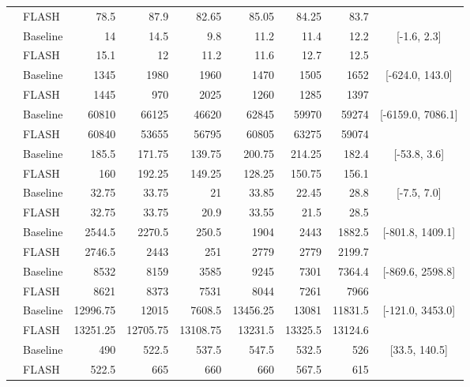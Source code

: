 \documentclass{article} %
\begin{document}
\begin{table}[H]
{\begin{tabular}{@{}ll*{5}{r}rc@{}}
 & FLASH & 78.5 & 87.9 & 82.65 & 85.05 & 84.25 & 83.7 &  \\
\addlinespace[1pt]
\multirow{2}{*}{Breakout} & Baseline & 14 & 14.5 & 9.8 & 11.2 & 11.4 & 12.2 & \multirow{2}{*}{[-1.6, 2.3]} \\
 & FLASH & 15.1 & 12 & 11.2 & 11.6 & 12.7 & 12.5 &  \\
\addlinespace[1pt]
\multirow{2}{*}{ChopperCommand} & Baseline & 1345 & 1980 & 1960 & 1470 & 1505 & 1652 & \multirow{2}{*}{[-624.0, 143.0]} \\
 & FLASH & 1445 & 970 & 2025 & 1260 & 1285 & 1397 &  \\
\addlinespace[1pt]
\multirow{2}{*}{CrazyClimber} & Baseline & 60810 & 66125 & 46620 & 62845 & 59970 & 59274 & \multirow{2}{*}{[-6159.0, 7086.1]} \\
 & FLASH & 60840 & 53655 & 56795 & 60805 & 63275 & 59074 &  \\
\addlinespace[1pt]
\multirow{2}{*}{DemonAttack} & Baseline & 185.5 & 171.75 & 139.75 & 200.75 & 214.25 & 182.4 & \multirow{2}{*}{[-53.8, 3.6]} \\
 & FLASH & 160 & 192.25 & 149.25 & 128.25 & 150.75 & 156.1 &  \\
\addlinespace[1pt]
\multirow{2}{*}{Freeway} & Baseline & 32.75 & 33.75 & 21 & 33.85 & 22.45 & 28.8 & \multirow{2}{*}{[-7.5, 7.0]} \\
 & FLASH & 32.75 & 33.75 & 20.9 & 33.55 & 21.5 & 28.5 &  \\
\addlinespace[1pt]
\multirow{2}{*}{Frostbite} & Baseline & 2544.5 & 2270.5 & 250.5 & 1904 & 2443 & 1882.5 & \multirow{2}{*}{[-801.8, 1409.1]} \\
 & FLASH & 2746.5 & 2443 & 251 & 2779 & 2779 & 2199.7 &  \\
\addlinespace[1pt]
\multirow{2}{*}{Gopher} & Baseline & 8532 & 8159 & 3585 & 9245 & 7301 & 7364.4 & \multirow{2}{*}{[-869.6, 2598.8]} \\
 & FLASH & 8621 & 8373 & 7531 & 8044 & 7261 & 7966 &  \\
\addlinespace[1pt]
\multirow{2}{*}{Hero} & Baseline & 12996.75 & 12015 & 7608.5 & 13456.25 & 13081 & 11831.5 & \multirow{2}{*}{[-121.0, 3453.0]} \\
 & FLASH & 13251.25 & 12705.75 & 13108.75 & 13231.5 & 13325.5 & 13124.6 &  \\
\addlinespace[1pt]
\multirow{2}{*}{Jamesbond} & Baseline & 490 & 522.5 & 537.5 & 547.5 & 532.5 & 526 & \multirow{2}{*}{[33.5, 140.5]} \\
 & FLASH & 522.5 & 665 & 660 & 660 & 567.5 & 615 &  \\

\end{tabular}}
\end{table}
\end{document}
